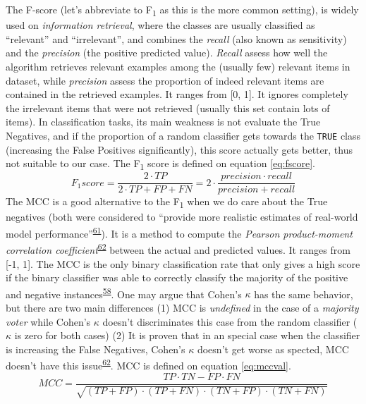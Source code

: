 \documentclass[12pt,twoside]{fmupthesis}
\begin{document}
The F-score (let's abbreviate to F\textsubscript{1} as this is the more common setting), is widely used on
\emph{information retrieval}, where the classes are usually classified as ``relevant'' and ``irrelevant'',
and combines the \emph{recall} (also known as sensitivity) and the \emph{precision} (the positive predicted
value). \emph{Recall} assess how well the algorithm retrieves relevant examples among the (usually few)
relevant items in dataset, while \emph{precision} assess the proportion of indeed relevant items are
contained in the retrieved examples. It ranges from {[}0, 1{]}. It ignores completely the irrelevant
items that were not retrieved (usually this set contain lots of items). In classification tasks, its
main weakness is not evaluate the True Negatives, and if the proportion of a random classifier gets
towards the \texttt{TRUE} class (increasing the False Positives significantly), this score actually gets
better, thus not suitable to our case. The F\textsubscript{1} score is defined on equation \eqref{eq:fscore}.
\begin{equation}
F_1 score = \frac{2 \cdot TP}{2 \cdot TP + FP + FN} = 2 \cdot \frac{precision \cdot recall}{precision + recall} \label{eq:fscore}
\end{equation}
The MCC is a good alternative to the F\textsubscript{1} when we do care about the True negatives (both were
considered to ``provide more realistic estimates of real-world model performance''\textsuperscript{\protect\hyperlink{ref-Dubey2018}{61}}). It
is a method to compute the \emph{Pearson product-moment correlation coefficient}\textsuperscript{\protect\hyperlink{ref-Delgado2019}{62}} between
the actual and predicted values. It ranges from {[}-1, 1{]}. The MCC is the only binary classification
rate that only gives a high score if the binary classifier was able to correctly classify the
majority of the positive and negative instances\textsuperscript{\protect\hyperlink{ref-Chicco2020}{58}}. One may argue that Cohen's \(\kappa\)
has the same behavior, but there are two main differences (1) MCC is \emph{undefined} in the case of a
\emph{majority voter} while Cohen's \(\kappa\) doesn't discriminates this case from the random classifier
(\(\kappa\) is zero for both cases) (2) It is proven that in an special case when the classifier is
increasing the False Negatives, Cohen's \(\kappa\) doesn't get worse as spected, MCC
doesn't have this issue\textsuperscript{\protect\hyperlink{ref-Delgado2019}{62}}. MCC is defined on equation \eqref{eq:mccval}.
\begin{equation}
MCC = \frac{TP \cdot TN - FP \cdot FN}{\sqrt{(TP + FP) \cdot (TP + FN) \cdot (TN + FP) \cdot (TN + FN)}} \label{eq:mccval}
\end{equation}
\end{document}

